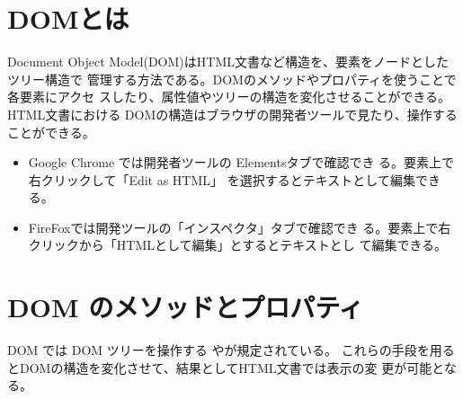 \section{DOMとは}
Document Object Model(DOM)はHTML文書など構造を、要素をノードとしたツリー構造で
管理する方法である。DOMのメソッドやプロパティを使うことで各要素にアクセ
スしたり、属性値やツリーの構造を変化させることができる。HTML文書における
DOMの構造はブラウザの開発者ツールで見たり、操作することができる。
\begin{itemize}
 \item Google Chrome では開発者ツールの Elementsタブで確認でき
       る。要素上で右クリックして「Edit as HTML」
       を選択するとテキストとして編集できる。
 \item FireFoxでは開発ツールの「インスペクタ」タブで確認でき
       る。要素上で右クリックから「HTMLとして編集」とするとテキストとし
       て編集できる。 
\end{itemize}
\newcommand{\DOMM}{\texttt}
\newcommand{\DOMP}{\texttt}
\newcommand{\DOM}{\texttt{DOM}}
\newcommand{\keyitem}{\relax}
\newcommand{\HTML}{HTML文書}
\section{DOM のメソッドとプロパティ}
DOM では DOM ツリーを操作する%
\keyitem{メソッド}や\keyitem{プロパティ}が規定されている。
これらの手段を用るとDOMの構造を変化させて、結果として\HTML では表示の変
更が可能となる。
\iffalse
 メソッド%
 では次のようなものあがある。
\begin{itemize}
 \item 条件に合う要素または要素のリストを得る。
 \item 要素の属性の参照、変更ができる。
 \item 要素を新規に作成する。
 \item ある要素に子要素を追加したり、取り除いたりする。
\end{itemize}
プロパティはそのオブジェクトが持つ性質であり、それらの値を参照できる。ほ
とんどのプロパティは書き直しできない。
\fi
\iffalse
なお、ここでのメソッドやプロパティは DOM文書で使用可能なものである。したがっ
て、\HTML も \DOM{} をサポートするブラウザであれば同様の方法で
部分的に書き直すことが可能である。
\fi
